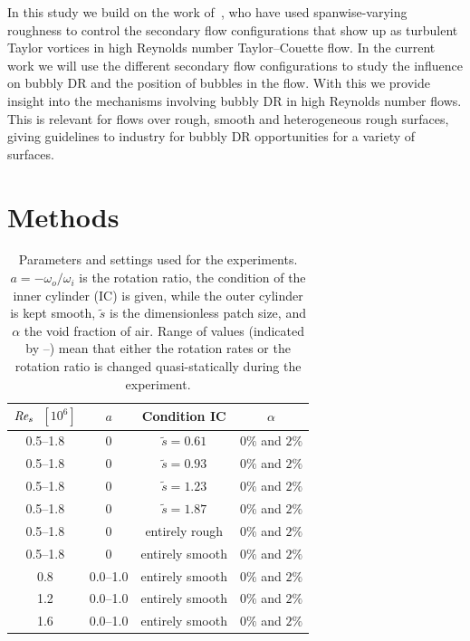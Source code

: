 \documentclass[aps,twocolumn,10pt,floatfix, superscriptaddress,longbibliography,pra]{revtex4-1}
\newcommand\Rey{\mbox{\textit{Re$_s$}}}  %
\begin{document}
In this study we build on the work of~\cite{Bakhuis2019}, who have used spanwise-varying roughness to control the secondary flow configurations that show up as turbulent Taylor vortices in high Reynolds number Taylor--Couette flow. In the current work we will use the different secondary flow configurations to study the influence on bubbly DR and the position of bubbles in the flow. With this we provide insight into the mechanisms involving bubbly  DR in high Reynolds number flows. This is relevant for flows over rough, smooth and heterogeneous rough surfaces, giving guidelines to industry for bubbly DR opportunities for a variety of surfaces. \\

\section{Methods}

\setlength{\tabcolsep}{0.7em}
\begin{table}[]
    \centering

    \begin{tabular}{|c|c|c|c|}
        \hline
       $\Rey$~$[10^6]$  & $a$ & Condition IC & $\alpha$  \\
       \hline
         0.5--1.8 & 0 & $\tilde s = 0.61$ & $0\%$ and $2\%$ \\
         0.5--1.8 & 0 & $\tilde s = 0.93$ & $0\%$ and $2\%$ \\
         0.5--1.8 & 0 & $\tilde s = 1.23$ & $0\%$ and $2\%$ \\
         0.5--1.8 & 0 & $\tilde s = 1.87$ & $0\%$ and $2\%$ \\
         0.5--1.8 & 0 & entirely rough & $0\%$ and $2\%$ \\
         0.5--1.8 & 0 & entirely smooth & $0\%$ and $2\%$ \\
         \hline
         0.8 & 0.0--1.0 & entirely smooth & $0\%$ and $2\%$ \\
         1.2 & 0.0--1.0 & entirely smooth & $0\%$ and $2\%$ \\
         1.6 & 0.0--1.0 & entirely smooth & $0\%$ and $2\%$ \\
        \hline
    \end{tabular}

    \caption{Parameters and settings used for the experiments. $a=-\omega_o/\omega_i$ is the rotation ratio, the condition of the inner cylinder (IC) is given, while the outer cylinder is kept smooth, $\tilde s$ is the dimensionless patch size, and $\alpha$ the void fraction of air. Range of values (indicated by --) mean that either the rotation rates or the rotation ratio is changed quasi-statically during the experiment.}
    \label{tab:parameters}
\end{table}
\end{document}
